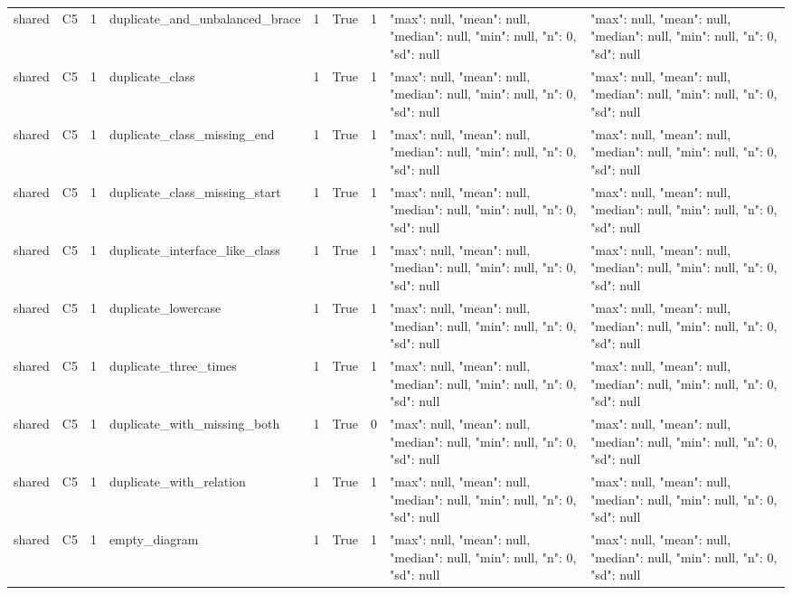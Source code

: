 \begin{tabular}{lllllllll}
shared & C5 & 1 & duplicate\_and\_unbalanced\_brace & 1 & True & 1 & {"max": null, "mean": null, "median": null, "min": null, "n": 0, "sd": null} & {"max": null, "mean": null, "median": null, "min": null, "n": 0, "sd": null} \\
shared & C5 & 1 & duplicate\_class & 1 & True & 1 & {"max": null, "mean": null, "median": null, "min": null, "n": 0, "sd": null} & {"max": null, "mean": null, "median": null, "min": null, "n": 0, "sd": null} \\
shared & C5 & 1 & duplicate\_class\_missing\_end & 1 & True & 1 & {"max": null, "mean": null, "median": null, "min": null, "n": 0, "sd": null} & {"max": null, "mean": null, "median": null, "min": null, "n": 0, "sd": null} \\
shared & C5 & 1 & duplicate\_class\_missing\_start & 1 & True & 1 & {"max": null, "mean": null, "median": null, "min": null, "n": 0, "sd": null} & {"max": null, "mean": null, "median": null, "min": null, "n": 0, "sd": null} \\
shared & C5 & 1 & duplicate\_interface\_like\_class & 1 & True & 1 & {"max": null, "mean": null, "median": null, "min": null, "n": 0, "sd": null} & {"max": null, "mean": null, "median": null, "min": null, "n": 0, "sd": null} \\
shared & C5 & 1 & duplicate\_lowercase & 1 & True & 1 & {"max": null, "mean": null, "median": null, "min": null, "n": 0, "sd": null} & {"max": null, "mean": null, "median": null, "min": null, "n": 0, "sd": null} \\
shared & C5 & 1 & duplicate\_three\_times & 1 & True & 1 & {"max": null, "mean": null, "median": null, "min": null, "n": 0, "sd": null} & {"max": null, "mean": null, "median": null, "min": null, "n": 0, "sd": null} \\
shared & C5 & 1 & duplicate\_with\_missing\_both & 1 & True & 0 & {"max": null, "mean": null, "median": null, "min": null, "n": 0, "sd": null} & {"max": null, "mean": null, "median": null, "min": null, "n": 0, "sd": null} \\
shared & C5 & 1 & duplicate\_with\_relation & 1 & True & 1 & {"max": null, "mean": null, "median": null, "min": null, "n": 0, "sd": null} & {"max": null, "mean": null, "median": null, "min": null, "n": 0, "sd": null} \\
shared & C5 & 1 & empty\_diagram & 1 & True & 1 & {"max": null, "mean": null, "median": null, "min": null, "n": 0, "sd": null} & {"max": null, "mean": null, "median": null, "min": null, "n": 0, "sd": null} \\

\end{tabular}
